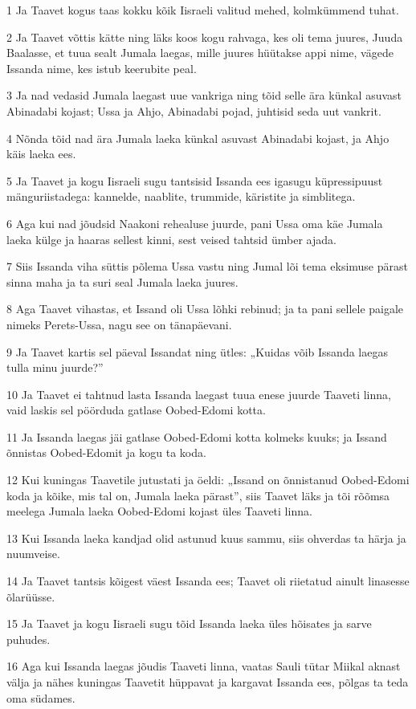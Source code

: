 \par 1 Ja Taavet kogus taas kokku kõik Iisraeli valitud mehed, kolmkümmend tuhat.
\par 2 Ja Taavet võttis kätte ning läks koos kogu rahvaga, kes oli tema juures, Juuda Baalasse, et tuua sealt Jumala laegas, mille juures hüütakse appi nime, vägede Issanda nime, kes istub keerubite peal.
\par 3 Ja nad vedasid Jumala laegast uue vankriga ning tõid selle ära künkal asuvast Abinadabi kojast; Ussa ja Ahjo, Abinadabi pojad, juhtisid seda uut vankrit.
\par 4 Nõnda tõid nad ära Jumala laeka künkal asuvast Abinadabi kojast, ja Ahjo käis laeka ees.
\par 5 Ja Taavet ja kogu Iisraeli sugu tantsisid Issanda ees igasugu küpressipuust mänguriistadega: kannelde, naablite, trummide, käristite ja simblitega.
\par 6 Aga kui nad jõudsid Naakoni rehealuse juurde, pani Ussa oma käe Jumala laeka külge ja haaras sellest kinni, sest veised tahtsid ümber ajada.
\par 7 Siis Issanda viha süttis põlema Ussa vastu ning Jumal lõi tema eksimuse pärast sinna maha ja ta suri seal Jumala laeka juures.
\par 8 Aga Taavet vihastas, et Issand oli Ussa lõhki rebinud; ja ta pani sellele paigale nimeks Perets-Ussa, nagu see on tänapäevani.
\par 9 Ja Taavet kartis sel päeval Issandat ning ütles: „Kuidas võib Issanda laegas tulla minu juurde?”
\par 10 Ja Taavet ei tahtnud lasta Issanda laegast tuua enese juurde Taaveti linna, vaid laskis sel pöörduda gatlase Oobed-Edomi kotta.
\par 11 Ja Issanda laegas jäi gatlase Oobed-Edomi kotta kolmeks kuuks; ja Issand õnnistas Oobed-Edomit ja kogu ta koda.
\par 12 Kui kuningas Taavetile jutustati ja öeldi: „Issand on õnnistanud Oobed-Edomi koda ja kõike, mis tal on, Jumala laeka pärast”, siis Taavet läks ja tõi rõõmsa meelega Jumala laeka Oobed-Edomi kojast üles Taaveti linna.
\par 13 Kui Issanda laeka kandjad olid astunud kuus sammu, siis ohverdas ta härja ja nuumveise.
\par 14 Ja Taavet tantsis kõigest väest Issanda ees; Taavet oli riietatud ainult linasesse õlarüüsse.
\par 15 Ja Taavet ja kogu Iisraeli sugu tõid Issanda laeka üles hõisates ja sarve puhudes.
\par 16 Aga kui Issanda laegas jõudis Taaveti linna, vaatas Sauli tütar Miikal aknast välja ja nähes kuningas Taavetit hüppavat ja kargavat Issanda ees, põlgas ta teda oma südames.
